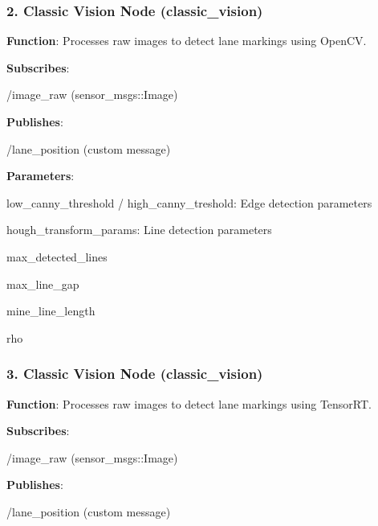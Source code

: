 \subsubsection*{2. Classic Vision Node ({\ttfamily classic\+\_\+vision})}

{\bfseries Function}\+: Processes raw images to detect lane markings using Open\+CV.
\begin{DoxyItemize}
\item {\bfseries Subscribes}\+:
\begin{DoxyItemize}
\item {\ttfamily /image\+\_\+raw} (sensor\+\_\+msgs\+::\+Image)
\end{DoxyItemize}
\item {\bfseries Publishes}\+:
\begin{DoxyItemize}
\item {\ttfamily /lane\+\_\+position} (custom message)
\end{DoxyItemize}
\item {\bfseries Parameters}\+:
\begin{DoxyItemize}
\item {\ttfamily low\+\_\+canny\+\_\+threshold} / {\ttfamily high\+\_\+canny\+\_\+treshold}\+: Edge detection parameters
\item {\ttfamily hough\+\_\+transform\+\_\+params}\+: Line detection parameters
\begin{DoxyItemize}
\item {\ttfamily max\+\_\+detected\+\_\+lines}
\item {\ttfamily max\+\_\+line\+\_\+gap}
\item {\ttfamily mine\+\_\+line\+\_\+length}
\item {\ttfamily rho}
\end{DoxyItemize}
\end{DoxyItemize}
\end{DoxyItemize}

\subsubsection*{3. Classic Vision Node ({\ttfamily classic\+\_\+vision})}

{\bfseries Function}\+: Processes raw images to detect lane markings using Tensor\+RT.
\begin{DoxyItemize}
\item {\bfseries Subscribes}\+:
\begin{DoxyItemize}
\item {\ttfamily /image\+\_\+raw} (sensor\+\_\+msgs\+::\+Image)
\end{DoxyItemize}
\item {\bfseries Publishes}\+:
\begin{DoxyItemize}
\item {\ttfamily /lane\+\_\+position} (custom message)
\end{DoxyItemize}
\end{DoxyItemize}

